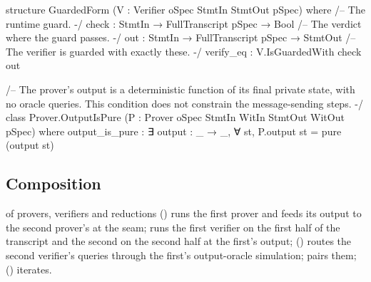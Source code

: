 

\begin{leancode}
structure GuardedForm (V : Verifier oSpec StmtIn StmtOut pSpec) where
  /-- The runtime guard. -/
  check : StmtIn → FullTranscript pSpec → Bool
  /-- The verdict where the guard passes. -/
  out : StmtIn → FullTranscript pSpec → StmtOut
  /-- The verifier is guarded with exactly these. -/
  verify_eq : V.IsGuardedWith check out
\end{leancode}



\begin{leancode}
/-- The prover's output is a deterministic function of its final private state, with no
oracle queries. This condition does not constrain the message-sending steps. -/
class Prover.OutputIsPure (P : Prover oSpec StmtIn WitIn StmtOut WitOut pSpec) where
    output_is_pure : ∃ output : _ → _, ∀ st, P.output st = pure (output st)
\end{leancode}


\subsection{Composition}\label{sec:gen-lib-ark-append}

\begin{define}{ of provers, verifiers and reductions}
 (\allowbreak{}) runs the first prover and feeds its output
to the second prover's  at the seam;  runs the first verifier on
the first half of the transcript and the second on the second half at the first's output;
 () routes the second verifier's queries through the
first's output-oracle simulation;  pairs them; 
() iterates.
\end{define}

